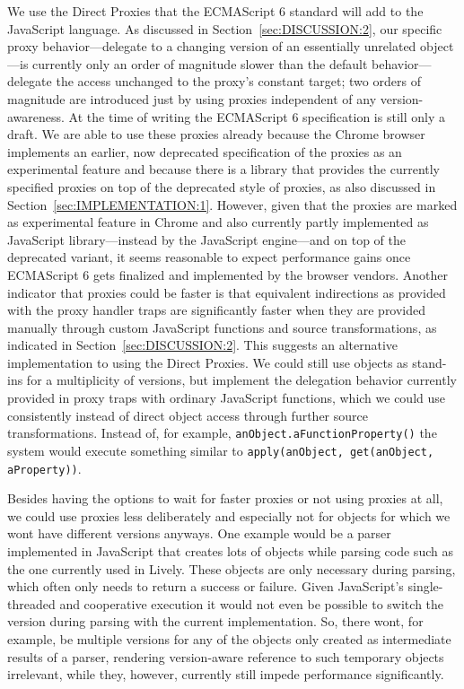 We use the Direct Proxies that the ECMAScript 6 standard will add to the JavaScript language.
As discussed in Section~\ref{sec:DISCUSSION:2}, our specific proxy behavior---delegate to a changing version of an essentially unrelated object---is currently only an order of magnitude slower than the default behavior---delegate the access unchanged to the proxy's constant target; two orders of magnitude are introduced just by using proxies independent of any version-awareness.
At the time of writing the ECMAScript 6 specification is still only a draft.
We are able to use these proxies already because the Chrome browser implements an earlier, now deprecated specification of the proxies as an experimental feature and because there is a library that provides the currently specified proxies on top of the deprecated style of proxies, as also discussed in Section~\ref{sec:IMPLEMENTATION:1}.
However, given that the proxies are marked as experimental feature in Chrome and also currently partly implemented as JavaScript library---instead by the JavaScript engine---and on top of the deprecated variant, it seems reasonable to expect performance gains once ECMAScript 6 gets finalized and implemented by the browser vendors.
Another indicator that proxies could be faster is that equivalent indirections as provided with the proxy handler traps are significantly faster when they are provided manually through custom JavaScript functions and source transformations, as indicated in Section~\ref{sec:DISCUSSION:2}.
This suggests an alternative implementation to using the Direct Proxies.
We could still use objects as stand-ins for a multiplicity of versions, but implement the delegation behavior currently provided in proxy traps with ordinary JavaScript functions, which we could use consistently instead of direct object access through further source transformations.
Instead of, for example, \lstinline{anObject.aFunctionProperty()} the system would execute something similar to \lstinline{apply(anObject, get(anObject, aProperty))}.

Besides having the options to wait for faster proxies or not using proxies at all, we could use proxies less deliberately and especially not for objects for which we wont have different versions anyways.
One example would be a parser implemented in JavaScript that creates lots of objects while parsing code such as the one currently used in Lively.
These objects are only necessary during parsing, which often only needs to return a success or failure.
Given JavaScript's single-threaded and cooperative execution it would not even be possible to switch the version during parsing with the current implementation.
So, there wont, for example, be multiple versions for any of the objects only created as intermediate results of a parser, rendering version-aware reference to such temporary objects irrelevant, while they, however, currently still impede performance significantly.



